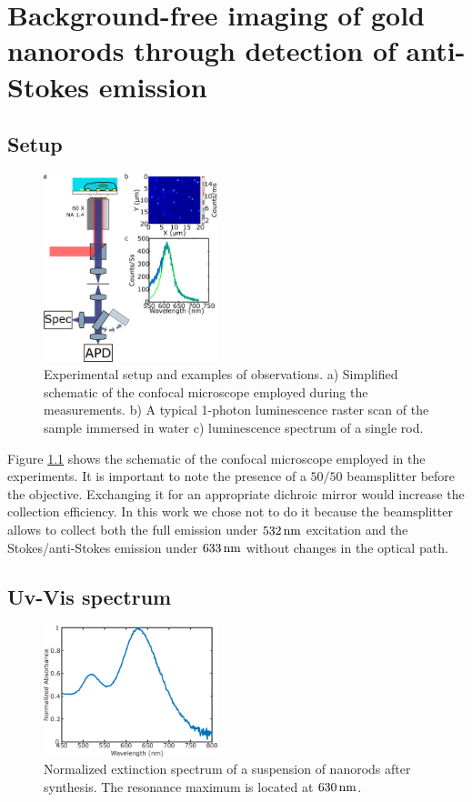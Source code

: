 \chapter[Background Free]{Background-free imaging of gold nanorods through
detection of anti-Stokes emission}

\section{Setup}

\begin{figure}[htp]
 \centering
 \includegraphics[width=0.45\textwidth]{Chapters/03_Background_Free/Figures/Supplementary/01_Setup/setup_1.png}
 \caption{Experimental setup and examples of observations. a) Simplified
 schematic of the confocal microscope employed during the measurements. b) A
 typical 1-photon luminescence raster scan of the sample immersed in water c)
 luminescence spectrum of a single rod.}
 \label{fig:setup}
\end{figure}

Figure \ref{fig:setup} shows the schematic of the confocal microscope employed
in the experiments. It is important to note the presence of a $50/50$
beamsplitter before the objective. Exchanging it for an appropriate dichroic
mirror would increase the collection efficiency. In this work we chose not to do
it because the beamsplitter allows to collect both the full emission under
$532\,\textrm{nm}$ excitation and the Stokes/anti-Stokes emission under $633\,\textrm{nm}$ without
changes in the optical path. 

\section{Uv-Vis spectrum}

\begin{figure}[htp]
 \centering
 \includegraphics[width=0.45\textwidth]{Chapters/03_Background_Free/Figures/Supplementary/02_UV-Vis/uvvis.png}
 \caption{Normalized extinction spectrum of a suspension of nanorods after
 synthesis. The resonance maximum is located at $630\,\textrm{nm}$.}
 \label{fig:uvvis}
 \end{figure}
 
